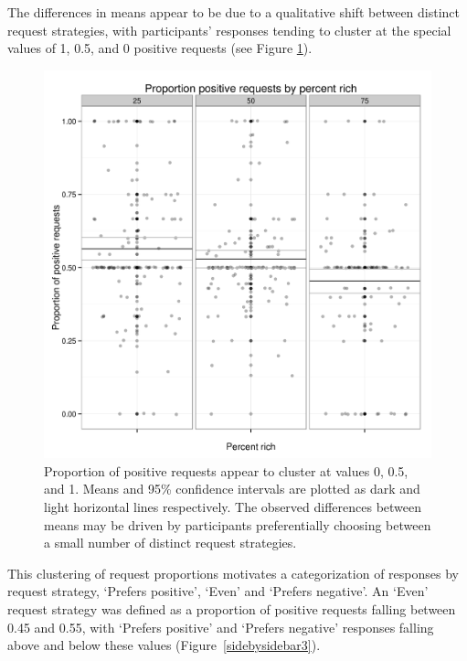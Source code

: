 \documentclass[10pt,letterpaper]{article}
\begin{document}
The differences in means appear to be due to a qualitative shift between distinct request strategies, with participants' responses tending to cluster at the special values of 1, 0.5, and 0 positive requests %
(see Figure \ref{propposdots}).

\begin{figure}[t]
\centering
\includegraphics[width=.5\textwidth]{propposplotlines.png}
\caption{Proportion of positive requests appear to cluster at values 0, 0.5, and 1. Means and 95\% confidence intervals are plotted as dark and light horizontal lines respectively. The observed differences between means may be driven by participants preferentially choosing between a small number of distinct request strategies.}
\label{propposdots}
\end{figure}

This clustering of request proportions motivates a categorization of responses by request strategy, `Prefers positive', `Even' and `Prefers negative'. An `Even' request strategy was defined as a proportion of positive requests falling between 0.45 and 0.55, with `Prefers positive' and `Prefers negative' responses falling above and below these values (Figure~\ref{sidebysidebar3}).
\end{document}

